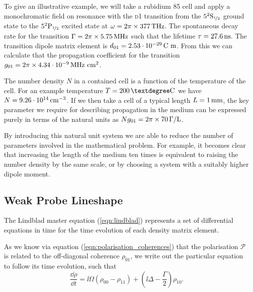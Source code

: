     To give an illustrative example, we will take a rubidium 85 cell and apply a
    monochromatic field on resonance with the \textsc{d1} transition from the
    $5^2\mathrm{S}_{\nicefrac{1}{2}}$ ground state to the
    $5^2\mathrm{P}_{\nicefrac{1}{2}}$ excited state at $\omega =
    \unit[2\pi\times377]{THz}$. The spontaneous decay rate for the transition
    $\Gamma = \unit[2\pi\times5.75]{MHz}$ such that the lifetime $\tau =
    \unit[27.6]{ns}$. The transition dipole matrix element is $d_{01} =
    \unit[2.53\cdot10^{-29}]{C~m}$. From this we can calculate that the
    propagation coefficient for the transition $g_{01} =
    \unit[2\pi\times4.34\cdot10^{-9}]{MHz~cm^2}$.

    The number density $N$ in a contained cell is a function of the temperature
    of the cell. For an example temperature $T = \unit[200]{\textdegree C}$ we
    have $N = \unit[9.26\cdot10^{14}]{cm^{-3}}$. If we then take a cell of a
    typical length $L = \unit[1]{mm}$, the key parameter we require for
    describing propagation in the medium can be expressed purely in terms of the
    natural units as $N g_{01} = \unit[2\pi\times70]{\Gamma /L}$.

    By introducing this natural unit system we are able to reduce the number of
    parameters involved in the mathematical problem. For example, it becomes
    clear that increasing the length of the medium ten times is equivalent to
    raising the number density by the same scale, or by choosing a system with a
    suitably higher dipole moment.

  \subsection{Weak Probe Lineshape}    

    The Lindblad master equation (\ref{eqn:lindblad}) represents a set of
    differential equations in time for the time evolution of each density matrix
    element.

    As we know via equation (\ref{eqn:polarisation_coherences}) that the
    polarisation $\mathcal{P}$ is related to the off-diagonal coherence
    $\rho_{01}$, we write out the particular equation to follow its time
    evolution, such that
    \begin{equation}
      \label{eqn:twolevel_coh_master_eqn}
      \frac{\dd \rho}{\dd t} = \ii \Omega \left( \rho_{00} - \rho_{11} \right) + \left( \ii \Delta - \frac{\Gamma}{2} \right) \rho_{10}.
    \end{equation}

